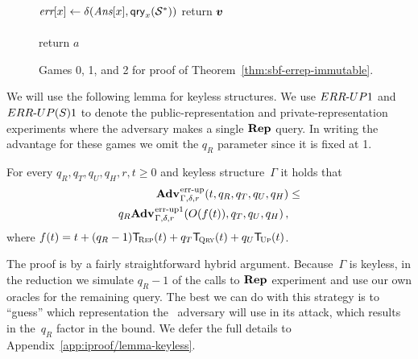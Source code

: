 \begin{figure*}
{{    \tab\tab $\textit{err}[x] \gets \delta(\textit{Ans}[x],\mathsf{qry}_x(\mathcal{S}^*))$
    }
    return $\boldsymbol{v}$
}
{
  \vspace{-7pt}
  \
      \hfill {} \\[2pt]
    \\[2pt]
    return $a$
}
\caption{Games 0, 1, and 2 for proof of Theorem~\ref{thm:sbf-errep-immutable}.}
\label{fig:sbf-errep-immutable/games}
\end{figure*}

We will use the following lemma for keyless structures. We use ${ERR\mbox{-}UP}1$ and
${ERR\mbox{-}UP(S)}1$ to denote the public-representation and private-representation
experiments where the adversary makes a single $\textup{\textbf{Rep}}\hspace{0.5pt}$ query. In writing the
advantage for these games we omit the $q_R$ parameter since it is fixed at 1.
%

\begin{lemma}\label{thm:lemma1}
  For every $q_R, q_T, q_U, q_H, r, t \geq 0$ and keyless structure~$\Gamma$ it
  holds that
  \begin{eqnarray*}
    \begin{aligned}
      \Adv{\errep}_{\Gamma,\delta,r}(t, q_R, q_T, q_U, q_H) &\leq \\
      q_R\Adv{\errep1}_{\Gamma,\delta,r}(O(f(t)), q_T, q_U, q_H) \,,
    \end{aligned}
  \end{eqnarray*}
  where $f(t) = t + (q_R-1)\ticks(\Rep,t) + q_T\ticks(\Qry,t) + q_U\ticks(\Up,t)$.
\end{lemma}
%
%
\noindent
The proof is by a fairly straightforward hybrid argument. Because~$\Gamma$ is
keyless, in the reduction we simulate $q_R-1$ of the calls to $\textup{\textbf{Rep}}\hspace{0.5pt}$ experiment
and use our own oracles for the remaining query. The best we can do with this
strategy is to ``guess'' which representation the \errep\ adversary will use in
its attack, which results in the~$q_R$ factor in the bound.
%
We defer the full details to Appendix~\ref{app:iproof/lemma-keyless}.

